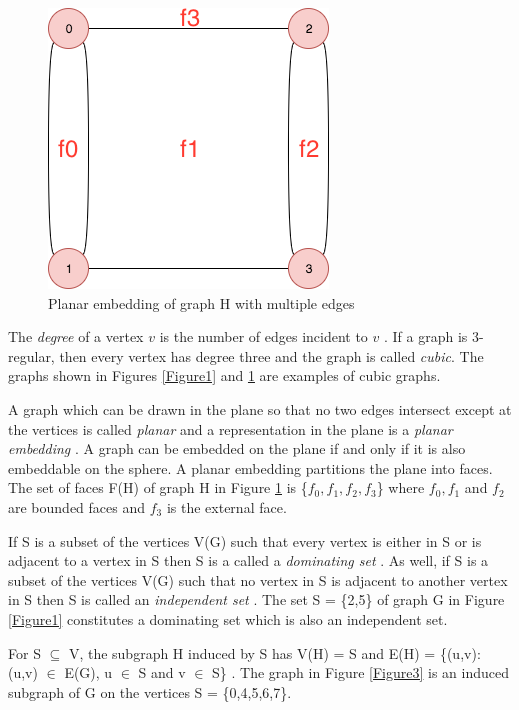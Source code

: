\documentclass[12pt]{article}
\begin{document}
\begin{figure}[H]
    \includegraphics[scale=.4, center]{Figure2}
    \caption{Planar embedding of graph H with multiple edges}
    \label{Figure2}
\end{figure}


The \textit{degree} of a vertex $v$ is the number of edges incident to $v$ \cite{BM}. If a graph is 3-regular, then every vertex has degree three and the graph is called \textit{cubic}. The graphs shown in Figures \ref{Figure1} and \ref{Figure2} are examples of cubic graphs.

A graph which can be drawn in the plane so that no two edges intersect except at the vertices is called \textit{planar} and a representation in the plane is a \textit{planar embedding} \cite{WM1}. A graph can be embedded on the plane if and only if it is also embeddable on the sphere. A planar embedding partitions the plane into faces. The set of faces F(H) of graph H in Figure \ref{Figure2} is \{$f_0, f_1, f_2, f_3$\} where $f_0, f_1$ and $f_2$ are bounded faces and $f_3$ is the external face.

If S is a subset of the vertices V(G) such that every vertex is either in S or is adjacent to a vertex in S then S is a called a \textit{dominating set} \cite{BM}. As well, if S is a subset of the vertices V(G) such that no vertex in S is adjacent to another vertex in S then S is called an \textit{independent set} \cite{BM}. The set S = \{2,5\} of graph G in Figure \ref{Figure1} constitutes a dominating set which is also an independent set.

For S $\subseteq$ V, the subgraph H induced by S has V(H) = S and E(H) = \{(u,v): (u,v) $\in$ E(G), u $\in$ S and v $\in$ S\} \cite{BM}. The graph in Figure \ref{Figure3} is an induced subgraph of G on the vertices S = \{0,4,5,6,7\}. 
\end{document}
